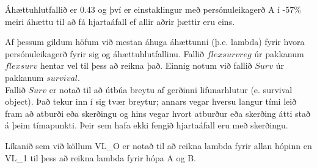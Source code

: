 \documentclass[
]{book}
\newenvironment{Shaded}{\begin{snugshade}}{\end{snugshade}}
\newcommand{\DecValTok}[1]{\textcolor[rgb]{0.00,0.00,0.81}{#1}}
\newcommand{\NormalTok}[1]{#1}
\newcommand{\OperatorTok}[1]{\textcolor[rgb]{0.81,0.36,0.00}{\textbf{#1}}}
\newcommand{\StringTok}[1]{\textcolor[rgb]{0.31,0.60,0.02}{#1}}
\begin{document}
\begin{Shaded}
\end{Shaded}

Áhættuhlutfallið er 0.43 og því er einstaklingur með persónuleikagerð A í -57\% meiri áhættu til að fá hjartaáfall ef allir aðrir þættir eru eins.

Af þessum gildum höfum við mestan áhuga áhættunni (þ.e. lambda) fyrir hvora persónuleikagerð fyrir sig og áhættuhlutfallinu. Fallið \(flexsurvreg\) úr pakkanum \(flexsurv\) hentar vel til þess að reikna það. Einnig notum við fallið \(Surv\) úr pakkanum \(survival\).\\
Fallið \(Surv\) er notað til að útbúa breytu af gerðinni lifunarhlutur (e. survival object). Það tekur inn í sig tvær breytur; annars vegar hversu langur tími leið fram að atburði eða skerðingu og hins vegar hvort atburður eða skerðing átti stað á þeim tímapunkti. Þeir sem hafa ekki fengið hjartaáfall eru með skerðingu.

Líkanið sem við köllum VL\_O er notað til að reikna lambda fyrir allan hópinn en VL\_1 til þess að reikna lambda fyrir hópa A og B.
\end{document}
